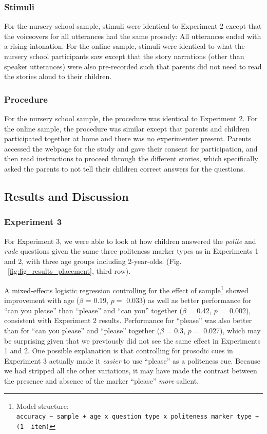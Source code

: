 \documentclass[10pt, letterpaper]{article}
\begin{document}
\subsubsection{Stimuli}\label{stimuli}

For the nursery school sample, stimuli were identical to Experiment 2
except that the voiceovers for all utterances had the same prosody: All
utterances ended with a rising intonation. For the online sample,
stimuli were identical to what the nursery school participants saw
except that the story narrations (other than speaker utterances) were
also pre-recorded such that parents did not need to read the stories
aloud to their children.

\subsubsection{Procedure}\label{procedure-2}

For the nursery school sample, the procedure was identical to Experiment
2. For the online sample, the procedure was similar except that parents
and children participated together at home and there was no experimenter
present. Parents accessed the webpage for the study and gave their
consent for participation, and then read instructions to proceed through
the different stories, which specifically asked the parents to not tell
their children correct answers for the questions.

\subsection{Results and Discussion}\label{results-and-discussion-2}

\subsubsection{Experiment 3}\label{experiment-3-1}

For Experiment 3, we were able to look at how children answered the
\emph{polite} and \emph{rude} questions given the same three politeness
marker types as in Experiments 1 and 2, with three age groups including
2-year-olds. (Fig. ~\ref{fig:fig_results_placement}, third row).

A mixed-effects logistic regression controlling for the effect of
sample\footnote{Model structure:
  \texttt{accuracy\ \textasciitilde{}\ sample\ +\ age\ x\ question\ type\ x\ politeness\ marker\ type\ +\ (1\ \textbar{}\ item)}}
showed improvement with age (\(\beta\) = 0.19, \(p =\) 0.033) as well as
better performance for ``can you please'' than ``please'' and ``can
you'' together (\(\beta\) = 0.42, \(p =\) 0.002), consistent with
Experiment 2 results. Performance for ``please'' was also better than
for ``can you please'' and ``please'' together (\(\beta\) = 0.3, \(p =\)
0.027), which may be surprising given that we previously did not see the
same effect in Experiments 1 and 2. One possible explanation is that
controlling for prosodic cues in Experiment 3 actually made it
\emph{easier} to use ``please'' as a politeness cue. Because we had
stripped all the other variations, it may have made the contrast between
the presence and absence of the marker ``please'' \emph{more} salient.
\end{document}
